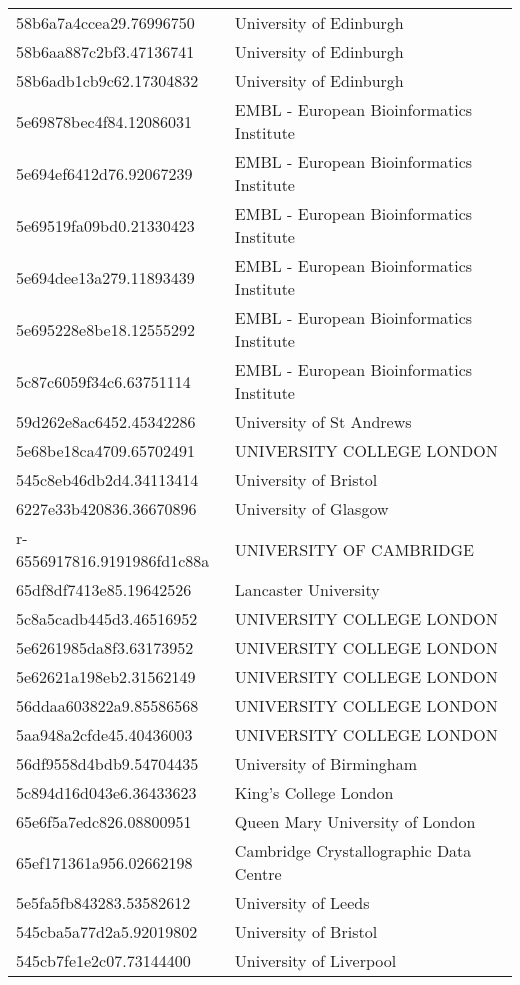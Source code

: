\begin{tabular}{ll}
58b6a7a4ccea29.76996750 & University of Edinburgh \\
58b6aa887c2bf3.47136741 & University of Edinburgh \\
58b6adb1cb9c62.17304832 & University of Edinburgh \\
5e69878bec4f84.12086031 & EMBL - European Bioinformatics Institute \\
5e694ef6412d76.92067239 & EMBL - European Bioinformatics Institute \\
5e69519fa09bd0.21330423 & EMBL - European Bioinformatics Institute \\
5e694dee13a279.11893439 & EMBL - European Bioinformatics Institute \\
5e695228e8be18.12555292 & EMBL - European Bioinformatics Institute \\
5c87c6059f34c6.63751114 & EMBL - European Bioinformatics Institute \\
59d262e8ac6452.45342286 & University of St Andrews \\
5e68be18ca4709.65702491 & UNIVERSITY COLLEGE LONDON \\
545c8eb46db2d4.34113414 & University of Bristol \\
6227e33b420836.36670896 & University of Glasgow \\
r-6556917816.9191986fd1c88a & UNIVERSITY OF CAMBRIDGE \\
65df8df7413e85.19642526 & Lancaster University \\
5c8a5cadb445d3.46516952 & UNIVERSITY COLLEGE LONDON \\
5e6261985da8f3.63173952 & UNIVERSITY COLLEGE LONDON \\
5e62621a198eb2.31562149 & UNIVERSITY COLLEGE LONDON \\
56ddaa603822a9.85586568 & UNIVERSITY COLLEGE LONDON \\
5aa948a2cfde45.40436003 & UNIVERSITY COLLEGE LONDON \\
56df9558d4bdb9.54704435 & University of Birmingham \\
5c894d16d043e6.36433623 & King's College London \\
65e6f5a7edc826.08800951 & Queen Mary University of London \\
65ef171361a956.02662198 & Cambridge Crystallographic Data Centre \\
5e5fa5fb843283.53582612 & University of Leeds \\
545cba5a77d2a5.92019802 & University of Bristol \\
545cb7fe1e2c07.73144400 & University of Liverpool \\

\end{tabular}
